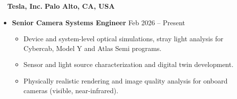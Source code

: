 ~~{\color{black}\textbf{Tesla, Inc.} \hfill  \textbf{Palo Alto, CA, USA}}\par
\begin{itemize}
    \item
    \textbf{Senior Camera Systems Engineer}
    \hfill  {Feb 2026 -- Present} \par
    \begin{itemize}
        \item Device and system-level optical simulations, stray light analysis for Cybercab, Model Y and Atlas Semi programs.
        \item Sensor and light source characterization and digital twin development. 
        \item Physically realistic rendering and image quality analysis for onboard cameras (visible, near-infrared).
    \end{itemize}
\end{itemize}